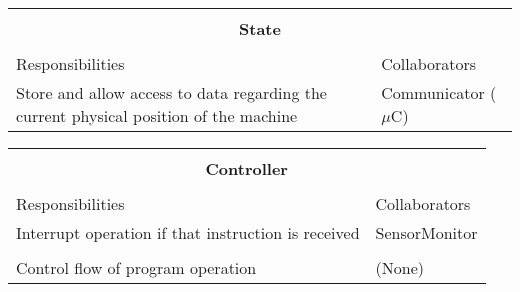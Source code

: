 \documentclass[titlepage]{article}
\begin{document}
\begin{table}[!htbp]
\centering
\begin{tabular}{| p{} | p{} |}\hline
	\multicolumn{2}{|l|}{}\\
	\multicolumn{2}{|c|}{\large{\textbf{State}}}\\
	\multicolumn{2}{|l|}{}\\\hline
	\vspace{0mm}\large{Responsibilities}\vspace{2mm} &\vspace{0mm}\large{Collaborators}\vspace{2mm}\\\hline
	\vspace{0mm}Store and allow access to data regarding the current physical position of the machine	&\vspace{0mm}Communicator ($\mu$C)\vspace{2mm}\vspace{2mm}\\\hline
\end{tabular}
\end{table}
\newpage

\begin{table}[!htbp]
\centering
\begin{tabular}{| p{} | p{} |}\hline
	\multicolumn{2}{|l|}{}\\
	\multicolumn{2}{|c|}{\large{\textbf{Controller}}}\\
	\multicolumn{2}{|l|}{}\\\hline
	\vspace{0mm}\large{Responsibilities}\vspace{2mm} &\vspace{0mm}\large{Collaborators}\vspace{2mm}\\\hline
	\vspace{0mm}Interrupt operation if that instruction is received	&\vspace{0mm}SensorMonitor \\&\\
	Control flow of program operation\vspace{2mm}	&(None)\vspace{2mm}\\\hline
\end{tabular}
\end{table}
\end{document}
